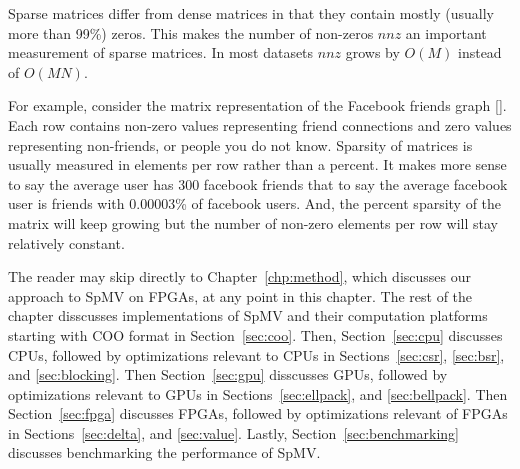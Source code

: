 \par Sparse matrices differ from dense matrices in that they contain mostly (usually more than 99\%) zeros. This makes the number of non-zeros $nnz$ an important measurement of sparse matrices. In most datasets $nnz$ grows by $O(M)$ instead of $O(MN)$.

For example, consider the matrix representation of the Facebook friends graph [\cite{prelim:zuckerburg}]. Each row contains non-zero values representing friend connections and zero values representing non-friends, or people you do not know. Sparsity of matrices is usually measured in elements per row rather than a percent. It makes more sense to say the average user has 300 facebook friends that to say the average facebook user is friends with 0.00003\% of facebook users. And, the percent sparsity of the matrix will keep growing but the number of non-zero elements per row will stay relatively constant.

The reader may skip directly to Chapter~\ref{chp:method}, which discusses our approach to SpMV on FPGAs, at any point in this chapter. The rest of the chapter disscusses implementations of SpMV and their computation platforms starting with COO format in Section~\ref{sec:coo}. Then, Section~\ref{sec:cpu} discusses CPUs, followed by optimizations relevant to CPUs in Sections~\ref{sec:csr}, \ref{sec:bsr}, and \ref{sec:blocking}. Then Section~\ref{sec:gpu} disscusses GPUs, followed by optimizations relevant to GPUs in Sections~\ref{sec:ellpack}, and \ref{sec:bellpack}. Then Section~\ref{sec:fpga} discusses FPGAs, followed by optimizations relevant of FPGAs in Sections~\ref{sec:delta}, and \ref{sec:value}. Lastly, Section~\ref{sec:benchmarking} discusses benchmarking the performance of SpMV.

